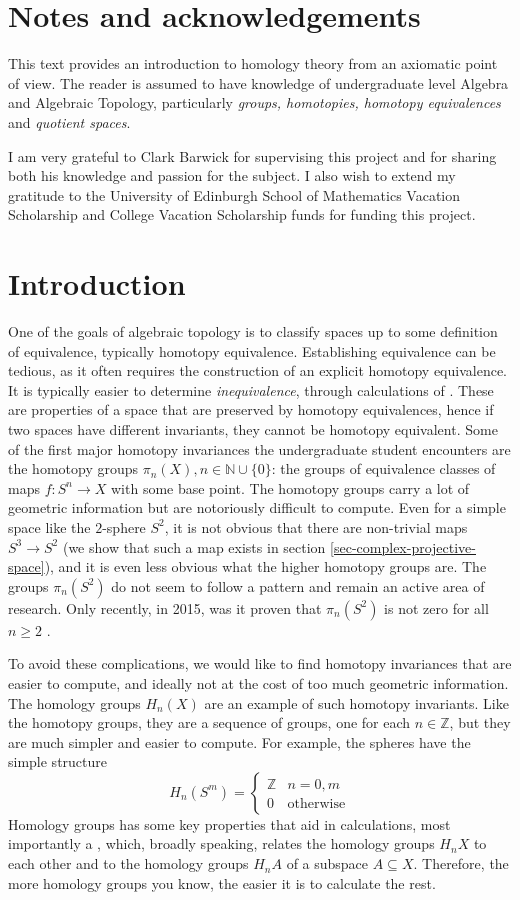 \section{Notes and acknowledgements}
This text provides an introduction to homology theory from an axiomatic point of view. The reader is assumed to have knowledge of undergraduate level Algebra and Algebraic Topology, particularly \textit{groups, homotopies, homotopy equivalences} and \textit{quotient spaces}.

I am very grateful to Clark Barwick for supervising this project and for sharing both his knowledge and passion for the subject. I also wish to extend my gratitude to the University of Edinburgh School of Mathematics Vacation Scholarship and College Vacation Scholarship funds for funding this project.
\section{Introduction}
One of the goals of algebraic topology is to classify spaces up to some definition of equivalence, typically homotopy equivalence. Establishing equivalence can be tedious, as it often requires the construction of an explicit homotopy equivalence. It is typically easier to determine \textit{inequivalence}, through calculations of . These are properties of a space that are preserved by homotopy equivalences, hence if two spaces have different invariants, they cannot be homotopy equivalent. Some of the first major homotopy invariances the undergraduate student encounters are the homotopy groups $\pi_n(X),n\in \mathbb{N}\cup \{0\}$: the groups of equivalence classes of maps $f:S^{n}\rightarrow X$ with some base point. The homotopy groups carry a lot of geometric information but are notoriously difficult to compute. Even for a simple space like the $2$-sphere $S^2$, it is not obvious that there are non-trivial maps $S^3\rightarrow S^2$ (we show that such a map exists in section \ref{sec-complex-projective-space}), and it is even less obvious what the higher homotopy groups are. The groups $\pi_n(S^2)$ do not seem to follow a pattern and remain an active area of research. Only recently, in 2015, was it proven that $\pi_n(S^2)$ is not zero for all $n\geq 2$ \cite{Ivanov}.

To avoid these complications, we would like to find homotopy invariances that are easier to compute, and ideally not at the cost of too much geometric information. The homology groups $H_n(X)$ are an example of such homotopy invariants. Like the homotopy groups, they are a sequence of groups, one for each $n\in \mathbb{Z}$, but they are much simpler and easier to compute. For example, the spheres have the simple structure $$H_n(S^m)=\begin{cases}\mathbb{Z} & n=0,m\\ 0 & \text{otherwise}\end{cases}$$ 
Homology groups has some key properties that aid in calculations, most importantly a , which, broadly speaking, relates the homology groups $H_nX$ to each other and to the homology groups $H_nA$ of a subspace $A\subseteq X$. Therefore, the more homology groups you know, the easier it is to calculate the rest.

